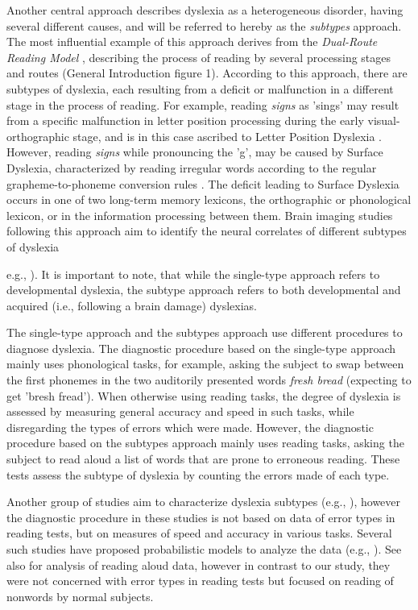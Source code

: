 Another central approach describes dyslexia as a heterogeneous disorder, having several different causes, and will be referred to hereby as the {\it subtypes} approach. The most influential example of this approach derives from the {\it Dual-Route Reading Model} \citep{cc93, ck12, mn73}, describing the process of reading by several processing stages and routes (General Introduction figure 1). According to this approach, there are subtypes of dyslexia, each resulting from a deficit or malfunction in a different stage in the process of reading. For example, reading {\it signs} as 'sings' may result from a specific malfunction in letter position processing during the early visual-orthographic stage, and is in this case ascribed to Letter Position Dyslexia \citep{fg01}. However, reading {\it signs} while pronouncing the 'g', may be caused by Surface Dyslexia, characterized by reading irregular words according to the regular grapheme-to-phoneme conversion rules \citep{c83}. The deficit leading to Surface Dyslexia occurs in one of two long-term memory lexicons, the orthographic or phonological lexicon, or in the information processing between them. Brain imaging studies following this approach aim to identify the neural correlates of different subtypes of dyslexia {e.g., \citealp{jct03, lptbadc09}). It is important to note, that while the single-type approach refers to developmental dyslexia, the subtype approach refers to both developmental and acquired (i.e., following a brain damage) dyslexias.

The single-type approach and the subtypes approach use different procedures to diagnose dyslexia. The diagnostic procedure based on the single-type approach mainly uses phonological tasks, for example, asking the subject to swap between the first phonemes in the two auditorily presented words {\it fresh bread} (expecting to get 'bresh fread'). When otherwise using reading tasks, the degree of dyslexia is assessed by measuring general accuracy and speed in such tasks, while disregarding the types of errors which were made. However, the diagnostic procedure based on the subtypes approach mainly uses reading tasks, asking the subject to read aloud a list of words that are prone to erroneous reading. These tests assess the subtype of dyslexia by counting the errors made of each type. 

Another group of studies aim to characterize dyslexia subtypes (e.g., \citealp{p06}), however the diagnostic procedure in these studies is not based on data of error types in reading tests, but on measures of speed and accuracy in various tasks. Several such studies have proposed probabilistic models to analyze the data (e.g., \citealp{plljbrak12}). See also \citet{rp14} for analysis of reading aloud data, however in contrast to our study, they were not concerned with error types in reading tests but focused on reading of nonwords by normal subjects.

}
